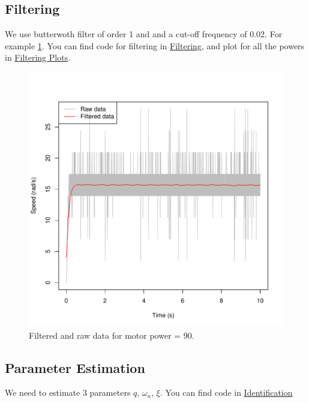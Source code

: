 \documentclass[a4paper,12pt,oneside]{article}
\begin{document}
\subsection {Filtering}
We use butterwoth filter of order 1 and and a cut-off frequency of 0.02. For example \cref{fig:filtered}. You can find code for filtering in \href{https://github.com/AliaksandrSiarohin/AppliedRobotics/tree/master/identification/filtering.r}{Filtering}, and plot for all the powers in \href{https://github.com/AliaksandrSiarohin/AppliedRobotics/tree/master/motor_data/plots/filtering}{Filtering Plots}.
\begin{figure}[t]%
	\centering
	\includegraphics[width=\columnwidth]{../motor_data/plots/filtering/90}
	\caption{Filtered and raw data for motor power = 90.}%
	\label{fig:filtered}%
\end{figure}

\subsection {Parameter Estimation}
We need to estimate 3 parameters $q$, $\omega_{n}$, $\xi$. You can find code in \href{https://github.com/AliaksandrSiarohin/AppliedRobotics/tree/master/identification/identification.r}{Identification}
\end{document}
